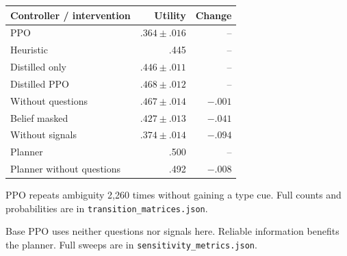 \noindent\begin{minipage}[t]{.48\textwidth}
\centering\small
\setlength{\tabcolsep}{3pt}
\begin{tabular}{lrr}
\toprule
Controller / intervention & Utility & Change \\
\midrule
PPO & $.364\pm.016$ & -- \\
Heuristic & .445 & -- \\
Distilled only & $.446\pm.011$ & -- \\
Distilled PPO & $.468\pm.012$ & -- \\
Without questions & $.467\pm.014$ & $-.001$ \\
Belief masked & $.427\pm.013$ & $-.041$ \\
Without signals & $.374\pm.014$ & $-.094$ \\
Planner & .500 & -- \\
Planner without questions & .492 & $-.008$ \\
\bottomrule
\end{tabular}
\label{tab:interventions}
\par\raggedright\normalsize PPO repeats ambiguity 2,260 times without gaining a type cue. Full counts and probabilities are in \texttt{transition\_matrices.json}.

\end{minipage}\hfill\begin{minipage}[t]{.48\textwidth}
\centering\small

\label{tab:course_sensitivity}
\par\raggedright\normalsize Base PPO uses neither questions nor signals here. Reliable information benefits the planner. Full sweeps are in \texttt{sensitivity\_metrics.json}.
\end{minipage}
